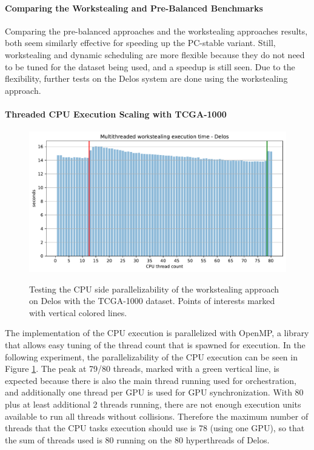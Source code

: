 \paragraph{Comparing the Workstealing and Pre-Balanced Benchmarks}
Comparing the pre-balanced approaches and the workstealing approaches results, both seem similarly effective for speeding up the PC-stable variant. Still, workstealing and dynamic scheduling are more flexible because they do not need to be tuned for the dataset being used, and a speedup is still seen. Due to the flexibility, further tests on the Delos system are done using the workstealing approach.

\paragraph{Threaded CPU Execution Scaling with TCGA-1000}
\begin{figure}[H]
  \caption{Testing the CPU side parallelizability of the workstealing approach on Delos with the TCGA-1000 dataset. Points of interests marked with vertical colored lines.}
  \includegraphics[width=\textwidth]{figures/threaded_wsteal.pdf}
  \centering
  \label{fig:wstealing_threaded_delos}
\end{figure}

The implementation of the CPU execution is parallelized with OpenMP, a library that allows easy tuning of the thread count that is spawned for execution. In the following experiment, the parallelizability of the CPU execution can be seen in Figure \ref{fig:wstealing_threaded_delos}.
The peak at 79/80 threads, marked with a green vertical line, is expected because there is also the main thread running used for orchestration, and additionally one thread per GPU is used for GPU synchronization. With 80 plus at least additional 2 threads running, there are not enough execution units available to run all threads without collisions. Therefore the maximum number of threads that the CPU tasks execution should use is 78 (using one GPU), so that the sum of threads used is 80 running on the 80 hyperthreads of Delos.

